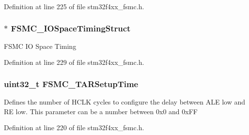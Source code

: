 Definition at line 225 of file stm32f4xx\-\_\-fsmc.\-h.

\hypertarget{struct_f_s_m_c___p_c_c_a_r_d_init_type_def_ad3bf6a882f03e3406149d94585dce78e}{
\subsubsection[{F\-S\-M\-C\-\_\-\-I\-O\-Space\-Timing\-Struct}]{$\ast$ F\-S\-M\-C\-\_\-\-I\-O\-Space\-Timing\-Struct}}\label{struct_f_s_m_c___p_c_c_a_r_d_init_type_def_ad3bf6a882f03e3406149d94585dce78e}
F\-S\-M\-C I\-O Space Timing 

Definition at line 229 of file stm32f4xx\-\_\-fsmc.\-h.

\hypertarget{struct_f_s_m_c___p_c_c_a_r_d_init_type_def_ab1fc3b07b6286b4974690191231f2773}{
\subsubsection[{F\-S\-M\-C\-\_\-\-T\-A\-R\-Setup\-Time}]{\setlength{\rightskip}{0pt plus 5cm}uint32\-\_\-t F\-S\-M\-C\-\_\-\-T\-A\-R\-Setup\-Time}}\label{struct_f_s_m_c___p_c_c_a_r_d_init_type_def_ab1fc3b07b6286b4974690191231f2773}
Defines the number of H\-C\-L\-K cycles to configure the delay between A\-L\-E low and R\-E low. This parameter can be a number between 0x0 and 0x\-F\-F 

Definition at line 220 of file stm32f4xx\-\_\-fsmc.\-h.

